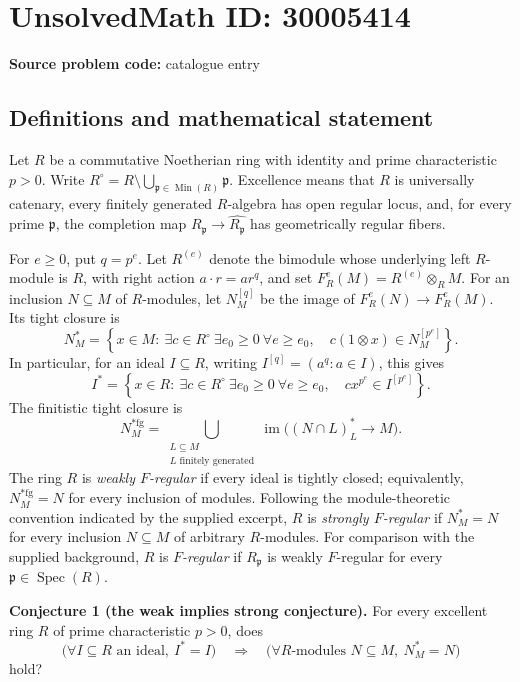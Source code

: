 \documentclass[11pt]{article}
\begin{document}
\section*{UnsolvedMath ID: 30005414}
\textbf{Source problem code:} catalogue entry
\subsection{Definitions and mathematical statement}
Let \(R\) be a commutative Noetherian ring with identity and prime characteristic \(p>0\). Write \(R^{\circ}=R\setminus\bigcup_{\mathfrak p\in\operatorname{Min}(R)}\mathfrak p\). Excellence means that \(R\) is universally catenary, every finitely generated \(R\)-algebra has open regular locus, and, for every prime \(\mathfrak p\), the completion map \(R_{\mathfrak p}\to\widehat{R_{\mathfrak p}}\) has geometrically regular fibers.

For \(e\geq 0\), put \(q=p^e\). Let \(R^{(e)}\) denote the bimodule whose underlying left \(R\)-module is \(R\), with right action \(a\cdot r=ar^q\), and set \(F_R^e(M)=R^{(e)}\otimes_R M\). For an inclusion \(N\subseteq M\) of \(R\)-modules, let \(N_M^{[q]}\) be the image of \(F_R^e(N)\to F_R^e(M)\). Its tight closure is
\[
N_M^*=\left\{x\in M:\ \exists c\in R^{\circ}\ \exists e_0\geq0\ \forall e\geq e_0,\quad c(1\otimes x)\in N_M^{[p^e]}\right\}.
\]
In particular, for an ideal \(I\subseteq R\), writing \(I^{[q]}=(a^q:a\in I)\), this gives
\[
I^*=\left\{x\in R:\ \exists c\in R^{\circ}\ \exists e_0\geq0\ \forall e\geq e_0,\quad cx^{p^e}\in I^{[p^e]}\right\}.
\]
The finitistic tight closure is
\[
N_M^{*\mathrm{fg}}=
\bigcup_{\substack{L\subseteq M\\L\text{ finitely generated}}}
\operatorname{im}\bigl((N\cap L)_L^*\longrightarrow M\bigr).
\]
The ring \(R\) is \emph{weakly \(F\)-regular} if every ideal is tightly closed; equivalently, \(N_M^{*\mathrm{fg}}=N\) for every inclusion of modules. Following the module-theoretic convention indicated by the supplied excerpt, \(R\) is \emph{strongly \(F\)-regular} if \(N_M^*=N\) for every inclusion \(N\subseteq M\) of arbitrary \(R\)-modules. For comparison with the supplied background, \(R\) is \emph{\(F\)-regular} if \(R_{\mathfrak p}\) is weakly \(F\)-regular for every \(\mathfrak p\in\operatorname{Spec}(R)\).

\textbf{Conjecture 1 (the weak implies strong conjecture).} For every excellent ring \(R\) of prime characteristic \(p>0\), does
\[
\bigl(\forall I\subseteq R\text{ an ideal},\ I^*=I\bigr)
\quad\Longrightarrow\quad
\bigl(\forall R\text{-modules }N\subseteq M,\ N_M^*=N\bigr)
\]
hold?
\end{document}
